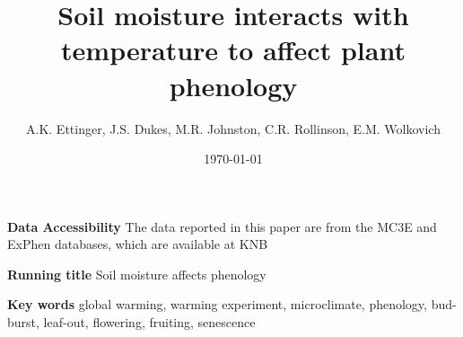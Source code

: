 \documentclass{article}
\begin{document}


\title{Soil moisture interacts with temperature to affect plant phenology}

\date{\today}
\maketitle %

\author{A.K. Ettinger, J.S. Dukes, M.R. Johnston, C.R. Rollinson, E.M. Wolkovich}


\textbf{Data Accessibility} %
The data reported in this paper are from the MC3E and ExPhen databases, which are available at KNB \citep{ettinger2018,ettinger2019}

\textbf{Running title} Soil moisture affects phenology


\textbf{Key words} global warming, warming experiment, microclimate, phenology, bud-burst, leaf-out, flowering, fruiting, senescence 


\clearpage
\end{document}
